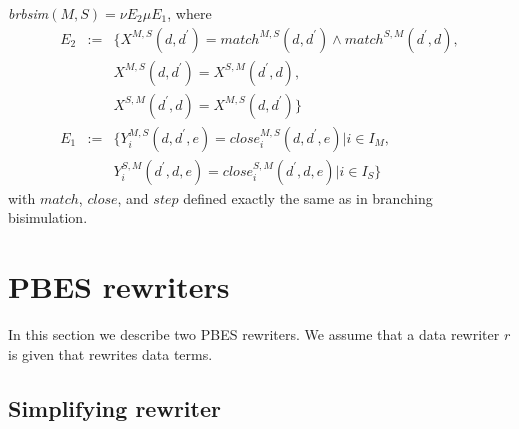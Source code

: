 \documentclass{article}
\begin{document}
\emph{brbsim}$(M,S)=\nu E_{2}\mu E_{1}$, where%
\begin{equation*}
\begin{array}{ccl}
E_{2} & := & \{X^{M,S}(d,d^{\prime })=match^{M,S}(d,d^{\prime })\wedge
match^{S,M}(d^{\prime },d), \\
&  & X^{M,S}(d,d^{\prime })=X^{S,M}(d^{\prime },d), \\
&  & X^{S,M}(d^{\prime },d)=X^{M,S}(d,d^{\prime })\} \\
E_{1} & := & \{Y_{i}^{M,S}(d,d^{\prime },e)=close_{i}^{M,S}(d,d^{\prime
},e)|i\in I_{M}, \\
&  & Y_{i}^{S,M}(d^{\prime },d,e)=close_{i}^{S,M}(d^{\prime },d,e)|i\in
I_{S}\}%
\end{array}%
\end{equation*}%
with $match$, $close$, and $step$ defined exactly the same as in branching
bisimulation.\newpage

\section{PBES rewriters}

In this section we describe two PBES rewriters. We assume that a data
rewriter $r$ is given that rewrites data terms.

\subsection{Simplifying rewriter}
\end{document}
